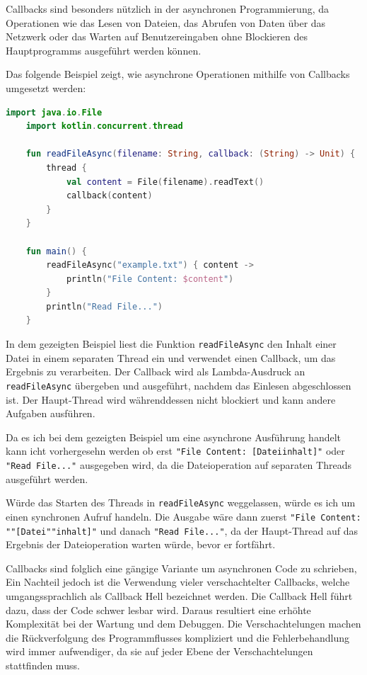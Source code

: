 \documentclass[fontsize=12pt,paper=a4,twoside=semi,parskip=half-,headsepline,headinclude]{scrreprt}
\begin{document}
Callbacks sind besonders nützlich in der asynchronen Programmierung, da Operationen wie das Lesen von Dateien, das Abrufen von Daten über das Netzwerk oder das Warten auf Benutzereingaben ohne Blockieren des Hauptprogramms ausgeführt werden können.

Das folgende Beispiel zeigt, wie asynchrone Operationen mithilfe von Callbacks umgesetzt werden:

\begin{lstlisting}[language=Kotlin]
	import java.io.File
	import kotlin.concurrent.thread
	
	fun readFileAsync(filename: String, callback: (String) -> Unit) {
		thread {
			val content = File(filename).readText()
			callback(content)
		}
	}
	
	fun main() {
		readFileAsync("example.txt") { content ->
			println("File Content: $content")
		}
		println("Read File...")
	}
\end{lstlisting}

In dem gezeigten Beispiel liest die Funktion \texttt{readFileAsync} den Inhalt einer Datei in einem separaten Thread ein und verwendet einen Callback, um das Ergebnis zu verarbeiten. Der Callback wird als Lambda-Ausdruck an \texttt{readFileAsync} übergeben und ausgeführt, nachdem das Einlesen abgeschlossen ist. Der Haupt-Thread wird währenddessen nicht blockiert und kann andere Aufgaben ausführen.

Da es ich bei dem gezeigten Beispiel um eine asynchrone Ausführung handelt kann icht vorhergesehn werden ob erst \texttt{"File Content: [Dateiinhalt]"} oder \texttt{"Read File..."} ausgegeben wird, da die Dateioperation auf separaten Threads ausgeführt werden.

Würde das Starten des Threads in \texttt{readFileAsync} weggelassen, würde es ich um einen synchronen Aufruf handeln. Die Ausgabe wäre dann zuerst \texttt{"File Content: ""[Datei""inhalt]"} und danach \texttt{"Read File..."}, da der Haupt-Thread auf das Ergebnis der Dateioperation warten würde, bevor er fortfährt.

Callbacks sind folglich eine gängige Variante um asynchronen Code zu schrieben, Ein Nachteil jedoch ist die Verwendung vieler verschachtelter Callbacks, welche umgangssprachlich als Callback Hell bezeichnet werden\cite{Leger2021}. Die Callback Hell führt dazu, dass der Code schwer lesbar wird. Daraus resultiert eine erhöhte Komplexität bei der Wartung und dem Debuggen. Die Verschachtelungen machen die Rückverfolgung des Programmflusses kompliziert und  die Fehlerbehandlung wird immer aufwendiger, da sie auf jeder Ebene der Verschachtelungen stattfinden muss.
\end{document}
